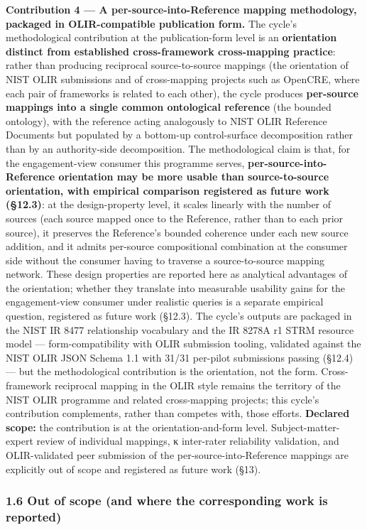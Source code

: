 \documentclass[
]{article}
\begin{document}
\textbf{Contribution 4 --- A per-source-into-Reference mapping
methodology, packaged in OLIR-compatible publication form.} The cycle's
methodological contribution at the publication-form level is an
\textbf{orientation distinct from established cross-framework
cross-mapping practice}: rather than producing reciprocal
source-to-source mappings (the orientation of NIST OLIR submissions and
of cross-mapping projects such as OpenCRE, where each pair of frameworks
is related to each other), the cycle produces \textbf{per-source
mappings into a single common ontological reference} (the bounded
ontology), with the reference acting analogously to NIST OLIR Reference
Documents but populated by a bottom-up control-surface decomposition
rather than by an authority-side decomposition. The methodological claim
is that, for the engagement-view consumer this programme serves,
\textbf{per-source-into-Reference orientation may be more usable than
source-to-source orientation, with empirical comparison registered as
future work (§12.3)}: at the design-property level, it scales linearly
with the number of sources (each source mapped once to the Reference,
rather than to each prior source), it preserves the Reference's bounded
coherence under each new source addition, and it admits per-source
compositional combination at the consumer side without the consumer
having to traverse a source-to-source mapping network. These design
properties are reported here as analytical advantages of the
orientation; whether they translate into measurable usability gains for
the engagement-view consumer under realistic queries is a separate
empirical question, registered as future work (§12.3). The cycle's
outputs are packaged in the NIST IR 8477 relationship vocabulary and the
IR 8278A r1 STRM resource model --- form-compatibility with OLIR
submission tooling, validated against the NIST OLIR JSON Schema 1.1 with
31/31 per-pilot submissions passing (§12.4) --- but the methodological
contribution is the orientation, not the form. Cross-framework
reciprocal mapping in the OLIR style remains the territory of the NIST
OLIR programme and related cross-mapping projects; this cycle's
contribution complements, rather than competes with, those efforts.
\textbf{Declared scope:} the contribution is at the orientation-and-form
level. Subject-matter-expert review of individual mappings, κ
inter-rater reliability validation, and OLIR-validated peer submission
of the per-source-into-Reference mappings are explicitly out of scope
and registered as future work (§13).

\subsubsection{1.6 Out of scope (and where the corresponding work is
reported)}\label{out-of-scope-and-where-the-corresponding-work-is-reported}
\end{document}
